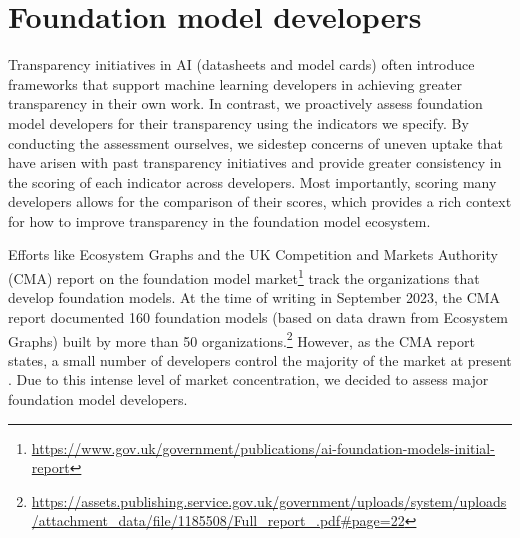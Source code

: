 \hypertarget{developers}{\section{Foundation model developers}}
\label{sec:developers}




\noindent Transparency initiatives in AI (\eg datasheets and model cards) often introduce frameworks that support machine learning developers in achieving greater transparency in their own work.
In contrast, we proactively assess foundation model developers for their transparency using the \numindicators indicators we specify.
By conducting the assessment ourselves, we sidestep concerns of uneven uptake that have arisen with past transparency initiatives \citep[\eg][]{gebru2018datasheets, mitchell2018modelcards} and provide greater consistency in the scoring of each indicator across developers.
Most importantly, scoring many developers allows for the comparison of their scores, which provides a rich context for how to improve transparency in the foundation model ecosystem.



Efforts like Ecosystem Graphs \citep{bommasani2023ecosystem} and the UK Competition and Markets Authority (CMA) report on the foundation model market\footnote{\url{https://www.gov.uk/government/publications/ai-foundation-models-initial-report}} track the organizations that develop foundation models.
At the time of writing in September 2023, the CMA report documented 160 foundation models (based on data drawn from Ecosystem Graphs) built by more than 50 organizations.\footnote{\url{https://assets.publishing.service.gov.uk/government/uploads/system/uploads/attachment_data/file/1185508/Full_report\_.pdf\#page=22}} 
However, as the CMA report states, a small number of developers control the majority of the market at present \citep{vipra2023concentration}.
Due to this intense level of market concentration, we decided to assess \numcompanies major foundation model developers.  \clearpage

